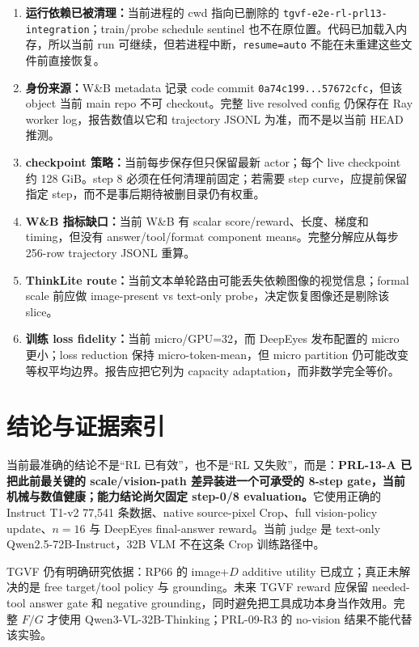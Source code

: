 \documentclass[UTF8,twocolumn,10pt,a4paper]{ctexart}
\newcommand{\TGVF}{\textsf{TGVF}}
\newcommand{\code}[1]{\texttt{#1}}
\begin{document}
\begin{enumerate}
  \item \textbf{运行依赖已被清理：}当前进程的 cwd 指向已删除的 \code{tgvf-e2e-rl-prl13-integration}；train/probe schedule sentinel 也不在原位置。代码已加载入内存，所以当前 run 可继续，但若进程中断，\code{resume=auto} 不能在未重建这些文件前直接恢复。
  \item \textbf{身份来源：}W\&B metadata 记录 code commit \code{0a74c199...57672cfc}，但该 object 当前 main repo 不可 checkout。完整 live resolved config 仍保存在 Ray worker log，报告数值以它和 trajectory JSONL 为准，而不是以当前 HEAD 推测。
  \item \textbf{checkpoint 策略：}当前每步保存但只保留最新 actor；每个 live checkpoint 约 128 GiB。step 8 必须在任何清理前固定；若需要 step curve，应提前保留指定 step，而不是事后期待被删目录仍有权重。
  \item \textbf{W\&B 指标缺口：}当前 W\&B 有 scalar score/reward、长度、梯度和 timing，但没有 answer/tool/format component means。完整分解应从每步 256-row trajectory JSONL 重算。
  \item \textbf{ThinkLite route：}当前文本单轮路由可能丢失依赖图像的视觉信息；formal scale 前应做 image-present vs text-only probe，决定恢复图像还是剔除该 slice。
  \item \textbf{训练 loss fidelity：}当前 micro/GPU=32，而 DeepEyes 发布配置的 micro 更小；loss reduction 保持 micro-token-mean，但 micro partition 仍可能改变等权平均边界。报告应把它列为 capacity adaptation，而非数学完全等价。
\end{enumerate}

\section{结论与证据索引}

当前最准确的结论不是“RL 已有效”，也不是“RL 又失败”，而是：\textbf{PRL-13-A 已把此前最关键的 scale/vision-path 差异装进一个可承受的 8-step gate，当前机械与数值健康；能力结论尚欠固定 step-0/8 evaluation。}它使用正确的 Instruct T1-v2 77,541 条数据、native source-pixel Crop、full vision-policy update、$n=16$ 与 DeepEyes final-answer reward。当前 judge 是 text-only Qwen2.5-72B-Instruct，32B VLM 不在这条 Crop 训练路径中。

\TGVF{} 仍有明确研究依据：RP66 的 image+$D$ additive utility 已成立；真正未解决的是 free target/tool policy 与 grounding。未来 TGVF reward 应保留 needed-tool answer gate 和 negative grounding，同时避免把工具成功本身当作效用。完整 $F/G$ 才使用 Qwen3-VL-32B-Thinking；PRL-09-R3 的 no-vision 结果不能代替该实验。
\end{document}
